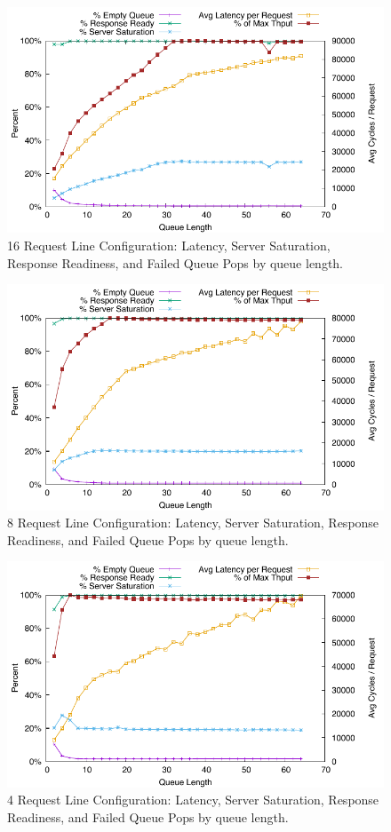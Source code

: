\documentclass{uicthesi}
\begin{document}
\begin{figure}[ht!]
\centering
\includegraphics[width=0.9\columnwidth]{FIG/16rldedicated_saturation.pdf}
\caption{16 Request Line Configuration: Latency, Server Saturation, Response Readiness, and Failed Queue Pops by queue length.}
\label{fig:saturation16RL}
\end{figure}

\begin{figure}[ht!]
\centering
\includegraphics[width=0.9\columnwidth]{FIG/8rldedicated_saturation.pdf}
\caption{8 Request Line Configuration: Latency, Server Saturation, Response Readiness, and Failed Queue Pops by queue length.}
\label{fig:saturation8RL}
\end{figure}

\begin{figure}[ht!]
\centering
\includegraphics[width=0.9\columnwidth]{FIG/4rldedicated_saturation.pdf}
\caption{4 Request Line Configuration: Latency, Server Saturation, Response Readiness, and Failed Queue Pops by queue length.}
\label{fig:saturation4RL}
\end{figure}
\end{document}
